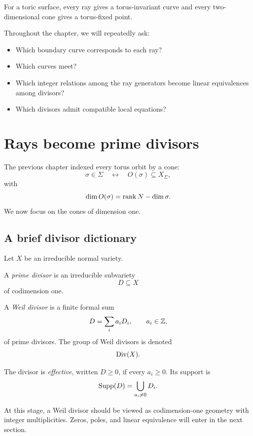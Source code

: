 \begin{surfacelaboratory}
For a toric surface, every ray gives a torus-invariant curve and every
two-dimensional cone gives a torus-fixed point.

Throughout the chapter, we will repeatedly ask:
\begin{itemize}
\item Which boundary curve corresponds to each ray?
\item Which curves meet?
\item Which integer relations among the ray generators become linear
equivalences among divisors?
\item Which divisors admit compatible local equations?
\end{itemize}
\end{surfacelaboratory}

\section{Rays become prime divisors}
\label{sec:rays-become-prime-divisors}

The previous chapter indexed every torus orbit by a cone:
\[
\sigma\in\Sigma
\quad\longleftrightarrow\quad
O(\sigma)\subseteq X_\Sigma,
\]
with
\[
\dim O(\sigma)
=
\operatorname{rank} N-\dim\sigma.
\]
We now focus on the cones of dimension one.

\subsection{A brief divisor dictionary}

\begin{agcheatsheet}
Let \(X\) be an irreducible normal variety.

A \emph{prime divisor} is an irreducible subvariety
\[
D\subseteq X
\]
of codimension one.

A \emph{Weil divisor} is a finite formal sum
\[
D=\sum_i a_iD_i,
\qquad
a_i\in\mathbb{Z},
\]
of prime divisors. The group of Weil divisors is denoted
\[
\operatorname{Div}(X).
\]

The divisor is \emph{effective}, written \(D\geq0\), if every
\(a_i\geq0\). Its support is
\[
\operatorname{Supp}(D)
=
\bigcup_{a_i\neq0}D_i.
\]

At this stage, a Weil divisor should be viewed as codimension-one
geometry with integer multiplicities. Zeros, poles, and linear
equivalence will enter in the next section.
\end{agcheatsheet}

